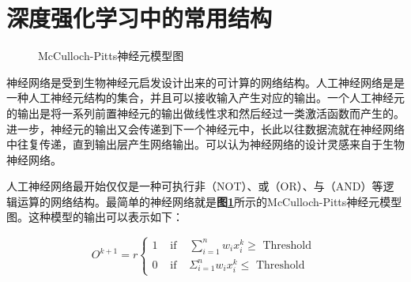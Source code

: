 \section{深度强化学习中的常用结构}
\label{sec: deep network}

\begin{figure}[!t]
	\centering
	\caption{McCulloch-Pitts神经元模型图}
	\label{Fig:Diagram of McCulloch-Pitts Neuron Model}
\end{figure}

神经网络是受到生物神经元启发设计出来的可计算的网络结构。人工神经网络是是一种人工神经元结构的集合，并且可以接收输入产生对应的输出。一个人工神经元的输出是将一系列前置神经元的输出做线性求和然后经过一类激活函数而产生的。进一步，神经元的输出又会传递到下一个神经元中，长此以往数据流就在神经网络中往复传递，直到输出层产生网络输出。可以认为神经网络的设计灵感来自于生物神经网络。

人工神经网络最开始仅仅是一种可执行非（NOT）、或（OR）、与（AND）等逻辑运算的网络结构。最简单的神经网络就是\textbf{图\ref{Fig:Diagram of McCulloch-Pitts Neuron Model}}所示的McCulloch-Pitts神经元模型图。这种模型的输出可以表示如下：

\begin{equation}
    O^{k+1}=r\left\{\begin{array}{lll}
1 & \text { if } & \sum_{i=1}^{n} w_{i} x_{i}^{k} \geq \text { Threshold } \\
0 & \text { if } & \Sigma_{i=1}^{n} w_{i} x_{i}^{k} \leq \text { Threshold }
\end{array}\right.
\end{equation}

